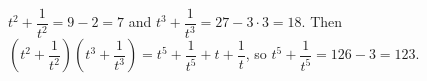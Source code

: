 $t^2+\dfrac1{t^2}=9-2=7$ and $t^3+\dfrac1{t^3}=27-3\cdot3=18$. Then $\left(t^2+\dfrac1{t^2}\right)\left(t^3+\dfrac1{t^3}\right)=t^5+\dfrac1{t^5}+t+\dfrac1t$, so $t^5+\dfrac1{t^5}=126-3=\boxed{123}$.
